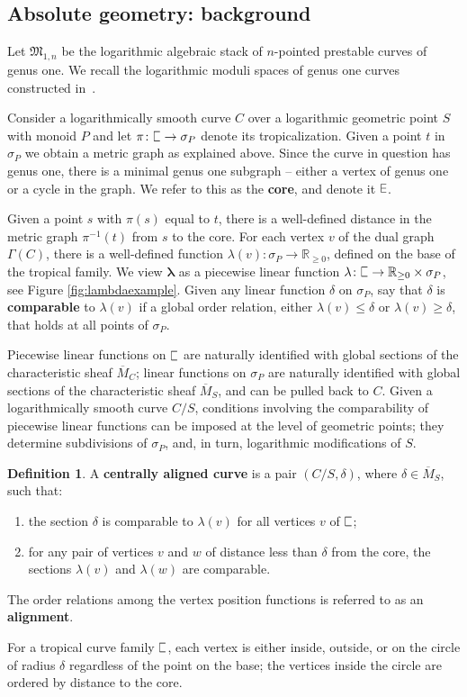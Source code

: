 \documentclass[11pt]{amsart}
\DeclareRobustCommand{\plE}{\text{\reflectbox{$\exists$}}}
\newcommand{\plC}{\scalebox{0.8}[1.3]{$\sqsubset$}}
\newcommand{\sqC}{\scalebox{0.8}[1.3]{$\sqsubset$}}
\renewcommand{\to}{\rightarrow}
\newcommand{\RR}{\mathbb{R}}
\theoremstyle{definition}
\theoremstyle{definition}
\newtheorem{definition}[thm]{Definition}
\begin{document}
\subsection{Absolute geometry: background} Let $\mathfrak M_{1,n}$ be the logarithmic algebraic stack of $n$-pointed prestable curves of genus one. We recall the logarithmic moduli spaces of genus one curves constructed in~\cite[\S 2 \& \S 4]{RSPW}. 

Consider a logarithmically smooth curve $C$ over a logarithmic geometric point $S$ with monoid $P$ and let $\pi\colon \plC\to \sigma_P$ denote its tropicalization. Given a point $t$ in $\sigma_P$ we obtain a metric graph as explained above. Since the curve in question has genus one, there is a minimal genus one subgraph -- either a vertex of genus one or a cycle in the graph. We refer to this as the \textbf{core}, and denote it $\plE$.

Given a point $s$ with $\pi(s)$ equal to $t$, there is a well-defined distance in the metric graph $\pi^{-1}(t)$ from $s$ to the core. 
For each vertex $v$ of the dual graph $\Gamma(C)$, there is a well-defined function $\lambda(v): \sigma_P\to \RR_{\geq 0}$, defined on the base of the tropical family. We view $\boldsymbol{\lambda}$ as a piecewise linear function $\lambda\colon\plC\to\RR_{\geq 0}\times\sigma_P$, see Figure \ref{fig:lambdaexample}. Given any linear function $\delta$ on $\sigma_P$, say that $\delta$ is \textbf{comparable} to $\lambda(v)$ if a global order relation, either $\lambda(v)\leq \delta$ or $\lambda(v)\geq \delta$, that holds at all points of $\sigma_P$. 

Piecewise linear functions on $\plC$ are naturally identified with global sections of the characteristic sheaf $\overline M_C$; linear functions on $\sigma_P$ are naturally identified with global sections of the characteristic sheaf $\overline M_S$, and can be pulled back to $C$. Given a logarithmically smooth curve $C/S$, conditions involving the comparability of piecewise linear functions can be imposed at the level of geometric points; they determine subdivisions of $\sigma_P$, and, in turn, logarithmic modifications of $S$. %

\begin{definition}\label{def: alignment}
A \textbf{centrally aligned curve} is a pair $(C/S,\delta)$, where $\delta\in\overline{M}_S$, such that:
\begin{enumerate}
    \item the section $\delta$ is comparable to $\lambda(v)$ for all vertices $v$ of $\plC$;
    \item for any pair of vertices $v$ and $w$ of distance less than $\delta$ from the core, the sections $\lambda(v)$ and $\lambda(w)$ are comparable.
\end{enumerate}
The order relations among the vertex position functions is referred to as an \textbf{alignment}. 
\end{definition}
For a tropical curve  family $\sqC$, each vertex is either inside, outside, or on the circle of radius $\delta$ regardless of the point on the base; the vertices inside the circle are ordered by distance to the core.
\end{document}
